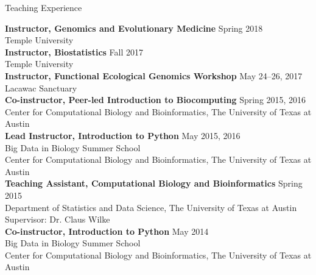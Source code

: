 \documentclass{resume} %
\begin{document}

\vspace*{0.5cm}
\begin{rSection}{Teaching Experience}
\vspace*{0.25cm}

\textbf{Instructor, Genomics and Evolutionary Medicine} \hfill Spring 2018 \\ Temple University \\

\textbf{Instructor, Biostatistics} \hfill Fall 2017 \\ Temple University \\

\textbf{Instructor, Functional Ecological Genomics Workshop} \hfill May 24--26, 2017 \\ Lacawac Sanctuary \\

\textbf{Co-instructor, Peer-led Introduction to Biocomputing} \hfill Spring 2015, 2016 \\ Center for Computational Biology and Bioinformatics, The University of Texas at Austin \\

\textbf{Lead Instructor, Introduction to Python} \hfill May 2015, 2016 \\ Big Data in Biology Summer School \\ Center for Computational Biology and Bioinformatics, The University of Texas at Austin \\

\textbf{Teaching Assistant, Computational Biology and Bioinformatics} \hfill Spring 2015 \\ Department of Statistics and Data Science, The University of Texas at Austin \\
Supervisor: Dr. Claus Wilke \\

\textbf{Co-instructor, Introduction to Python} \hfill May 2014 \\ Big Data in Biology Summer School \\ Center for Computational Biology and Bioinformatics, The University of Texas at Austin \\


\end{rSection}
\end{document}
